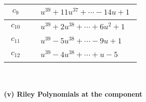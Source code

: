 \documentclass[1p]{elsarticle_modified}
\theoremstyle{definition}
\begin{document}
\begin{tabular}{m{50pt}|m{274pt}}
\hline $$\begin{aligned}c_{9}\end{aligned}$$&$\begin{aligned}
&u^{39}+11 u^{37}+\cdots-14 u+1
\end{aligned}$\\
\hline $$\begin{aligned}c_{10}\end{aligned}$$&$\begin{aligned}
&u^{39}+2 u^{38}+\cdots+6 u^2+1
\end{aligned}$\\
\hline $$\begin{aligned}c_{11}\end{aligned}$$&$\begin{aligned}
&u^{39}-5 u^{38}+\cdots-9 u+1
\end{aligned}$\\
\hline $$\begin{aligned}c_{12}\end{aligned}$$&$\begin{aligned}
&u^{39}-4 u^{38}+\cdots+u-5
\end{aligned}$\\
\hline
\end{tabular}\\~\\
\newpage\renewcommand{\arraystretch}{1}
\flushleft \textbf{(v) Riley Polynomials at the component}\newline \\
\end{document}

